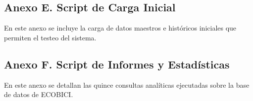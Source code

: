 

\newpage

\subsection{Anexo E. Script de Carga Inicial}
\label{sec:anexo_e}
En este anexo se incluye la carga de datos maestros e históricos iniciales que permiten el testeo del sistema.



\newpage

\subsection{Anexo F. Script de Informes y Estadísticas}
\label{sec:anexo_f}
En este anexo se detallan las quince consultas analíticas ejecutadas sobre la base de datos de ECOBICI.


